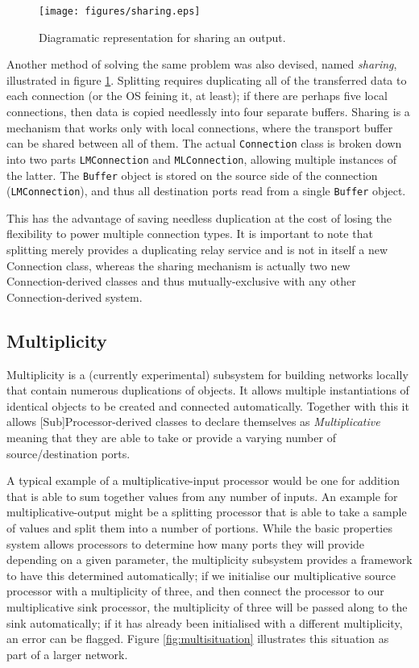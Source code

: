 \begin{figure}[ht!]
\centering
\texttt{[image: figures/sharing.eps]}
\caption{Diagramatic representation for sharing an output.}
\label{fig:sharing}
\end{figure}

Another method of solving the same problem was also devised, named \textit{sharing}, illustrated in figure \ref{fig:sharing}. Splitting requires duplicating all of the transferred data to each connection (or the OS feining it, at least); if there are perhaps five local connections, then data is copied needlessly into four separate buffers. Sharing is a mechanism that works only with local connections, where the transport buffer can be shared between all of them. The actual \texttt{Connection} class is broken down into two parts \texttt{LMConnection} and \texttt{MLConnection}, allowing multiple instances of the latter. The \texttt{Buffer} object is stored on the source side of the connection (\texttt{LMConnection}), and thus all destination ports read from a single \texttt{Buffer} object.

This has the advantage of saving needless duplication at the cost of losing the flexibility to power multiple connection types. It is important to note that splitting merely provides a duplicating relay service and is not in itself a new Connection class, whereas the sharing mechanism is actually two new Connection-derived classes and thus mutually-exclusive with any other Connection-derived system.

\subsection{Multiplicity}\label{sec:multiplicity}

Multiplicity is a (currently experimental) subsystem for building networks locally that contain numerous duplications of objects. It allows multiple instantiations of identical objects to be created and connected automatically. Together with this it allows [Sub]Processor-derived classes to declare themselves as \textit{Multiplicative} meaning that they are able to take or provide a varying number of source/destination ports.

A typical example of a multiplicative-input processor would be one for addition that is able to sum together values from any number of inputs. An example for multiplicative-output might be a splitting processor that is able to take a sample of values and split them into a number of portions. While the basic properties system allows processors to determine how many ports they will provide depending on a given parameter, the multiplicity subsystem provides a framework to have this determined automatically; if we initialise our multiplicative source processor with a multiplicity of three, and then connect the processor to our multiplicative sink processor, the multiplicity of three will be passed along to the sink automatically; if it has already been initialised with a different multiplicity, an error can be flagged. Figure \ref{fig:multisituation} illustrates this situation as part of a larger network.


